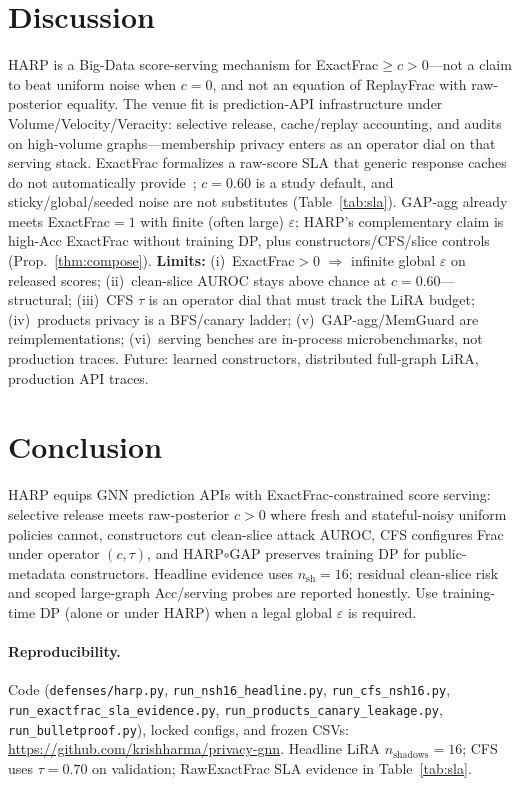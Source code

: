 \documentclass[conference]{IEEEtran}
\begin{document}
\section{Discussion}
\label{sec:discussion}
HARP is a Big-Data score-serving mechanism for ExactFrac$\ge c{>}0$---not a claim to beat uniform noise when $c{=}0$, and not an equation of ReplayFrac with raw-posterior equality.
The venue fit is prediction-API infrastructure under Volume/Velocity/Veracity: selective release, cache/replay accounting, and audits on high-volume graphs---membership privacy enters as an operator dial on that serving stack.
ExactFrac formalizes a raw-score SLA that generic response caches do not automatically provide~\cite{crankshaw2017clipper,triton2024cache}; $c{=}0.60$ is a study default, and sticky/global/seeded noise are not substitutes (Table~\ref{tab:sla}).
GAP-agg already meets ExactFrac${=}1$ with finite (often large) $\varepsilon$; HARP's complementary claim is high-Acc ExactFrac without training DP, plus constructors/CFS/slice controls (Prop.~\ref{thm:compose}).
\textbf{Limits:} (i)~ExactFrac${>}0$ $\Rightarrow$ infinite global $\varepsilon$ on released scores; (ii)~clean-slice AUROC stays above chance at $c{=}0.60$---structural; (iii)~CFS $\tau$ is an operator dial that must track the LiRA budget; (iv)~products privacy is a BFS/canary ladder; (v)~GAP-agg/MemGuard are reimplementations; (vi)~serving benches are in-process microbenchmarks, not production traces.
Future: learned constructors, distributed full-graph LiRA, production API traces.

\section{Conclusion}
\label{sec:conclusion}
HARP equips GNN prediction APIs with ExactFrac-constrained score serving: selective release meets raw-posterior $c{>}0$ where fresh and stateful-noisy uniform policies cannot, constructors cut clean-slice attack AUROC, CFS configures Frac under operator $(c,\tau)$, and HARP$\circ$GAP preserves training DP for public-metadata constructors.
Headline evidence uses $n_{\mathrm{sh}}{=}16$; residual clean-slice risk and scoped large-graph Acc/serving probes are reported honestly.
Use training-time DP (alone or under HARP) when a legal global $\varepsilon$ is required.

\paragraph{Reproducibility.}
Code (\texttt{defenses/harp.py}, \texttt{run\_nsh16\_headline.py}, \texttt{run\_cfs\_nsh16.py}, \texttt{run\_exactfrac\_sla\_evidence.py}, \texttt{run\_products\_canary\_leakage.py}, \texttt{run\_bulletproof.py}), locked configs, and frozen CSVs: \url{https://github.com/krishharma/privacy-gnn}.
Headline LiRA $n_{\mathrm{shadows}}{=}16$; CFS uses $\tau{=}0.70$ on validation; RawExactFrac SLA evidence in Table~\ref{tab:sla}.
\end{document}
